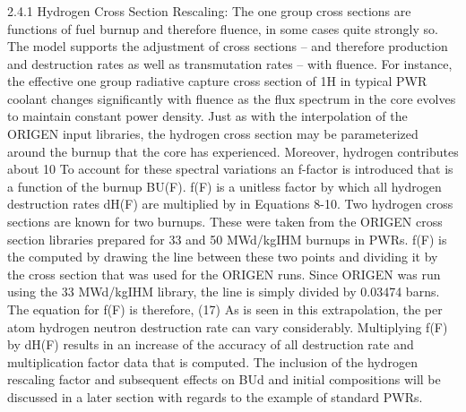 \subsubsection{}
\label{1g_sec:}
2.4.1 Hydrogen Cross Section Rescaling:
The one group cross sections are functions of fuel burnup and therefore fluence, in some cases quite strongly so.  The model supports the adjustment of cross sections – and therefore production and destruction rates as well as transmutation rates – with fluence.  For instance, the effective one group radiative capture cross section of 1H in typical PWR coolant changes significantly with fluence as the flux spectrum in the core evolves to maintain constant power density.  Just as with the interpolation of the ORIGEN input libraries, the hydrogen cross section may be parameterized around the burnup that the core has experienced.  Moreover, hydrogen contributes about 10%
To account for these spectral variations an f-factor is introduced that is a function of the burnup BU(F).    f(F) is a unitless factor by which all hydrogen destruction rates dH(F) are multiplied by in Equations 8-10. Two hydrogen cross sections are known for two burnups.  These were taken from the ORIGEN cross section libraries prepared for 33 and 50 MWd/kgIHM burnups in PWRs.
f(F) is the computed by drawing the line between these two points and dividing it by the cross section that was used for the ORIGEN runs.  Since ORIGEN was run using the 33 MWd/kgIHM library, the line is simply divided by 0.03474 barns.  The equation for f(F) is therefore, 
                        (17)
As is seen in this extrapolation, the per atom hydrogen neutron destruction rate can vary considerably.  Multiplying f(F) by dH(F) results in an increase of the accuracy of all destruction rate and multiplication factor data that is computed.  The inclusion of the hydrogen rescaling factor and subsequent effects on BUd and initial compositions will be discussed in a later section with regards to the example of standard PWRs.  


